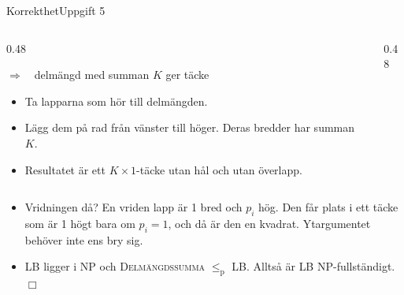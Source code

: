 \documentclass[aspectratio=169,10pt]{beamer}
\newcommand{\prob}[1]{\textsc{#1}}
\newcommand{\lep}{\le_{\mathrm{p}}}
\begin{document}
\begin{frame}{Korrekthet}{Uppgift 5}
  \begin{columns}[T]
    \begin{column}{0.48\textwidth}
      \begin{block}{$\Rightarrow$\ \ delmängd med summan $K$ ger täcke}
        \begin{itemize}
          \item Ta lapparna som hör till delmängden.
          \item<2-> Lägg dem på rad från vänster till höger. Deras bredder har summan $K$.
          \item<3-> Resultatet är ett $K\times1$-täcke utan hål och utan överlapp.
        \end{itemize}
      \end{block}
    \end{column}
    \begin{column}{0.48\textwidth}
    \end{column}
  \end{columns}
  \begin{itemize}
    \item<7-> Vridningen då? En vriden lapp är 1 bred och $p_i$ hög. Den får plats i ett täcke som är 1 högt bara om $p_i=1$, och då är den en kvadrat. Ytargumentet behöver inte ens bry sig.
    \item<8-> \prob{LB} ligger i NP och \prob{Delmängdssumma} $\lep$ \prob{LB}. Alltså är \prob{LB} NP-fullständigt. \hfill$\Box$
  \end{itemize}
\end{frame}
\end{document}
